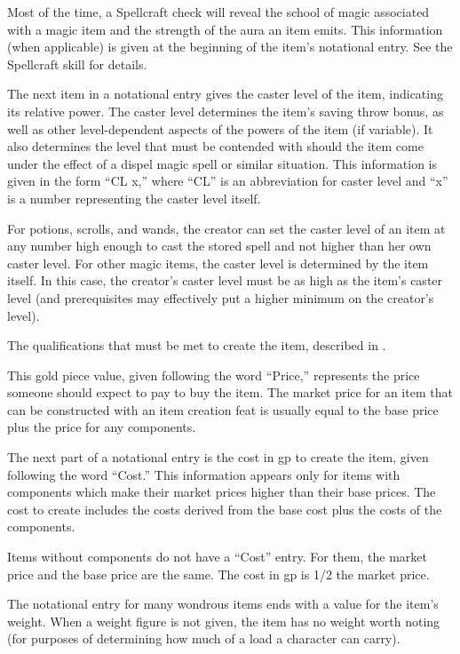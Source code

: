 \begin{itemize*}
 Most of the time, a Spellcraft check will reveal the school of magic associated with a magic item and the strength of the aura an item emits. This information (when applicable) is given at the beginning of the item's notational entry. See the Spellcraft skill for details.

 The next item in a notational entry gives the caster level of the item, indicating its relative power. The caster level determines the item's saving throw bonus, as well as other level-dependent aspects of the powers of the item (if variable). It also determines the level that must be contended with should the item come under the effect of a dispel magic spell or similar situation. This information is given in the form ``CL x,'' where ``CL'' is an abbreviation for caster level and ``x'' is a number representing the caster level itself.

For potions, scrolls, and wands, the creator can set the caster level of an item at any number high enough to cast the stored spell and not higher than her own caster level. For other magic items, the caster level is determined by the item itself. In this case, the creator's caster level must be as high as the item's caster level (and prerequisites may effectively put a higher minimum on the creator's level).

 The qualifications that must be met to create the item, described in .

 This gold piece value, given following the word ``Price,'' represents the price someone should expect to pay to buy the item. The market price for an item that can be constructed with an item creation feat is usually equal to the base price plus the price for any components.

 The next part of a notational entry is the cost in gp to create the item, given following the word ``Cost.'' This information appears only for items with components which make their market prices higher than their base prices. The cost to create includes the costs derived from the base cost plus the costs of the components.

Items without components do not have a ``Cost'' entry. For them, the market price and the base price are the same. The cost in gp is 1/2 the market price.

 The notational entry for many wondrous items ends with a value for the item's weight. When a weight figure is not given, the item has no weight worth noting (for purposes of determining how much of a load a character can carry).
\end{itemize*}

